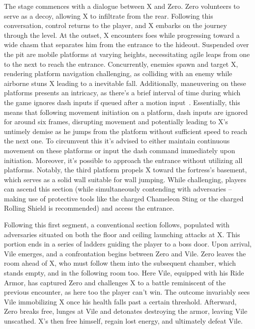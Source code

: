The stage commences with a dialogue between X and Zero. Zero volunteers to serve as a decoy, allowing X to infiltrate from the rear. Following this conversation, control returns to the player, and X embarks on the journey through the level. At the outset, X encounters foes while progressing toward a wide chasm that separates him from the entrance to the hideout. Suspended over the pit are mobile platforms at varying heights, necessitating agile leaps from one to the next to reach the entrance. Concurrently, enemies spawn and target X, rendering platform navigation challenging, as colliding with an enemy while airborne stuns X leading to a inevitable fall. Additionally, maneuvering on these platforms presents an intricacy, as there's a brief interval of time during which the game ignores dash inputs if queued after a motion input~\cite{RTA_wiki:X1}. Essentially, this means that following movement initiation on a platform, dash inputs are ignored for around six frames, disrupting movement and potentially leading to X's untimely demise as he jumps from the platform without sufficient speed to reach the next one. To circumvent this it's advised to either maintain continuous movement on these platforms or input the dash command immediately upon initiation. Moreover, it's possible to approach the entrance without utilizing all platforms. Notably, the third platform propels X toward the fortress's basement, which serves as a solid wall suitable for wall jumping. While challenging, players can ascend this section (while simultaneously contending with adversaries – making use of protective tools like the charged Chameleon Sting or the charged Rolling Shield is recommended) and access the entrance.

Following this first segment, a conventional section follows, populated with adversaries situated on both the floor and ceiling launching attacks at X. This portion ends in a series of ladders guiding the player to a boss door. Upon arrival, Vile emerges, and a confrontation begins between Zero and Vile. Zero leaves the room ahead of X, who must follow them into the subsequent chamber, which stands empty, and in the following room too. Here Vile, equipped with his Ride Armor, has captured Zero and challenges X to a battle reminiscent of the previous encounter, as here too the player can't win. The outcome invariably sees Vile immobilizing X once his health falls past a certain threshold. Afterward, Zero breaks free, lunges at Vile and detonates destroying the armor, leaving Vile unscathed. X's then free himself, regain lost energy, and ultimately defeat Vile.

